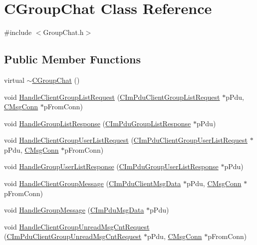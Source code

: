 \hypertarget{class_c_group_chat}{}\section{C\+Group\+Chat Class Reference}
\label{class_c_group_chat}


{\ttfamily \#include $<$Group\+Chat.\+h$>$}

\subsection*{Public Member Functions}
\begin{DoxyCompactItemize}
\item 
virtual \hyperlink{class_c_group_chat_ae7fff49dbf5e1e4b81a98c914d0b8733}{$\sim$\+C\+Group\+Chat} ()
\item 
void \hyperlink{class_c_group_chat_a29c7c024452f35c14716967f0a5b5b0d}{Handle\+Client\+Group\+List\+Request} (\hyperlink{class_c_im_pdu_client_group_list_request}{C\+Im\+Pdu\+Client\+Group\+List\+Request} $\ast$p\+Pdu, \hyperlink{class_c_msg_conn}{C\+Msg\+Conn} $\ast$p\+From\+Conn)
\item 
void \hyperlink{class_c_group_chat_a34cd4f47dafdeb9661a79f29339a3e49}{Handle\+Group\+List\+Response} (\hyperlink{class_c_im_pdu_group_list_response}{C\+Im\+Pdu\+Group\+List\+Response} $\ast$p\+Pdu)
\item 
void \hyperlink{class_c_group_chat_aea4cf3bad9c84cc7ceb87cffa89c6e0d}{Handle\+Client\+Group\+User\+List\+Request} (\hyperlink{class_c_im_pdu_client_group_user_list_request}{C\+Im\+Pdu\+Client\+Group\+User\+List\+Request} $\ast$p\+Pdu, \hyperlink{class_c_msg_conn}{C\+Msg\+Conn} $\ast$p\+From\+Conn)
\item 
void \hyperlink{class_c_group_chat_a72f2a6696278bd54161972ae7eb9a761}{Handle\+Group\+User\+List\+Response} (\hyperlink{class_c_im_pdu_group_user_list_response}{C\+Im\+Pdu\+Group\+User\+List\+Response} $\ast$p\+Pdu)
\item 
void \hyperlink{class_c_group_chat_aa90ce6557c63e7866d1b42f0fc94541d}{Handle\+Client\+Group\+Message} (\hyperlink{class_c_im_pdu_client_msg_data}{C\+Im\+Pdu\+Client\+Msg\+Data} $\ast$p\+Pdu, \hyperlink{class_c_msg_conn}{C\+Msg\+Conn} $\ast$p\+From\+Conn)
\item 
void \hyperlink{class_c_group_chat_acbdc2d6395fa46d3bae541a2db1070ac}{Handle\+Group\+Message} (\hyperlink{class_c_im_pdu_msg_data}{C\+Im\+Pdu\+Msg\+Data} $\ast$p\+Pdu)
\item 
void \hyperlink{class_c_group_chat_a784e1daa217fa377264890ac619ab894}{Handle\+Client\+Group\+Unread\+Msg\+Cnt\+Request} (\hyperlink{class_c_im_pdu_client_group_unread_msg_cnt_request}{C\+Im\+Pdu\+Client\+Group\+Unread\+Msg\+Cnt\+Request} $\ast$p\+Pdu, \hyperlink{class_c_msg_conn}{C\+Msg\+Conn} $\ast$p\+From\+Conn)

\end{DoxyCompactItemize}
